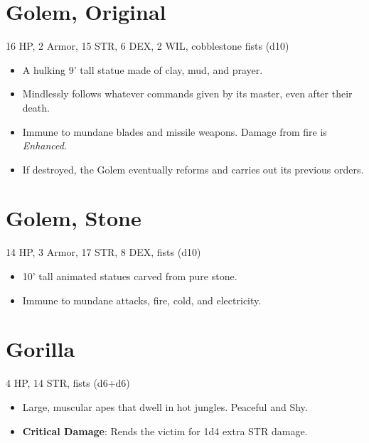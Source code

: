 \documentclass[
  10pt,
  american,
]{article}
\begin{document}
\hypertarget{golem-original}{%
\section{Golem, Original}\label{golem-original}}

16 HP, 2 Armor, 15 STR, 6 DEX, 2 WIL, cobblestone fists (d10)

\begin{samepage}
\begin{itemize}
\setlength\itemsep{-.5em}
\item A hulking 9’ tall statue made of clay, mud, and prayer.
\item Mindlessly follows whatever commands given by its master, even after their death.
\item Immune to mundane blades and missile weapons. Damage from fire is \emph{Enhanced}.
\item If destroyed, the Golem eventually reforms and carries out its previous orders.
\end{itemize}
\end{samepage}

\hypertarget{golem-stone}{%
\section{Golem, Stone}\label{golem-stone}}

14 HP, 3 Armor, 17 STR, 8 DEX, fists (d10)

\begin{samepage}
\begin{itemize}
\setlength\itemsep{-.5em}
\item 10’ tall animated statues carved from pure stone.
\item Immune to mundane attacks, fire, cold, and electricity.
\end{itemize}
\end{samepage}

\hypertarget{gorilla}{%
\section{Gorilla}\label{gorilla}}

4 HP, 14 STR, fists (d6+d6)

\begin{samepage}
\begin{itemize}
\setlength\itemsep{-.5em}
\item Large, muscular apes that dwell in hot jungles. Peaceful and Shy.
\item \textbf{Critical Damage}: Rends the victim for 1d4 extra STR damage.
\end{itemize}
\end{samepage}
\end{document}
